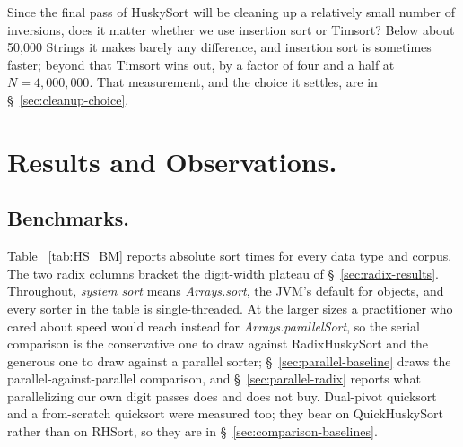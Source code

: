 \documentclass[twoside,leqno,twocolumn]{article}
\begin{document}
Since the final pass of HuskySort will be cleaning up a relatively small number of inversions, does it
matter whether we use insertion sort or Timsort?
Below about 50,000 Strings it makes barely any difference, and insertion sort is sometimes faster;
beyond that Timsort wins out, by a factor of four and a half at $N = 4{,}000{,}000$.
That measurement, and the choice it settles, are in \S~\ref{sec:cleanup-choice}.


\section{Results and Observations.}
\subsection{Benchmarks.}

Table ~\ref{tab:HS_BM} reports absolute sort times for every data type and corpus.
The two radix columns bracket the digit-width plateau of \S~\ref{sec:radix-results}.
Throughout, \emph{system sort} means \textit{Arrays.sort}, the JVM's default for objects, and every
sorter in the table is single-threaded.
At the larger sizes a practitioner who cared about speed would reach instead for
\mbox{\textit{Arrays.parallelSort}}, so the serial comparison is the conservative one to draw against
RadixHuskySort and the generous one to draw against a parallel sorter;
\S~\ref{sec:parallel-baseline} draws the parallel-against-parallel comparison, and
\S~\ref{sec:parallel-radix} reports what parallelizing our own digit passes does and does not buy.
Dual-pivot quicksort and a from-scratch quicksort were measured too; they bear on QuickHuskySort
rather than on RHSort, so they are in \S~\ref{sec:comparison-baselines}.
\end{document}
